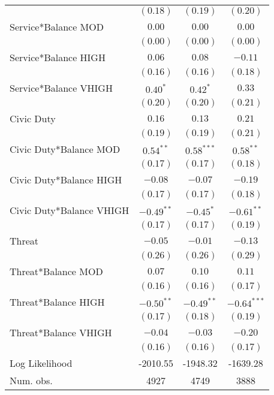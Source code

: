 \documentclass[12pt,titlepage]{article}
\begin{document}
\begin{center}
\begin{longtable}{| l | c |  c| c|}
                  & $(0.18)$      & $(0.19)$      & $(0.20)$      \\
Service*Balance MOD  & $0.00$        & $0.00$        & $0.00$        \\
                  & $(0.00)$      & $(0.00)$      & $(0.00)$      \\
Service*Balance HIGH  & $0.06$        & $0.08$        & $-0.11$       \\
                  & $(0.16)$      & $(0.16)$      & $(0.18)$      \\
Service*Balance VHIGH  & $0.40^{*}$    & $0.42^{*}$    & $0.33$        \\
                  & $(0.20)$      & $(0.20)$      & $(0.21)$      \\
Civic Duty              & $0.16$        & $0.13$        & $0.21$        \\
                  & $(0.19)$      & $(0.19)$      & $(0.21)$      \\
Civic Duty*Balance MOD   & $0.54^{**}$   & $0.58^{***}$  & $0.58^{**}$   \\
                  & $(0.17)$      & $(0.17)$      & $(0.18)$      \\
Civic Duty*Balance HIGH   & $-0.08$       & $-0.07$       & $-0.19$       \\
                  & $(0.17)$      & $(0.17)$      & $(0.18)$      \\
Civic Duty*Balance VHIGH   & $-0.49^{**}$  & $-0.45^{*}$   & $-0.61^{**}$  \\
                  & $(0.17)$      & $(0.17)$      & $(0.19)$      \\
Threat            & $-0.05$       & $-0.01$       & $-0.13$       \\
                  & $(0.26)$      & $(0.26)$      & $(0.29)$      \\
Threat*Balance MOD & $0.07$        & $0.10$        & $0.11$        \\
                  & $(0.16)$      & $(0.16)$      & $(0.17)$      \\
Threat*Balance HIGH & $-0.50^{**}$  & $-0.49^{**}$  & $-0.64^{***}$ \\
                  & $(0.17)$      & $(0.18)$      & $(0.19)$      \\
Threat*Balance VHIGH & $-0.04$       & $-0.03$       & $-0.20$       \\
                  & $(0.16)$      & $(0.16)$      & $(0.17)$      \\
\hline
Log Likelihood    & -2010.55      & -1948.32      & -1639.28      \\
Num. obs.         & 4927          & 4749          & 3888          \\
\end{longtable}
\end{center}
\end{document}

